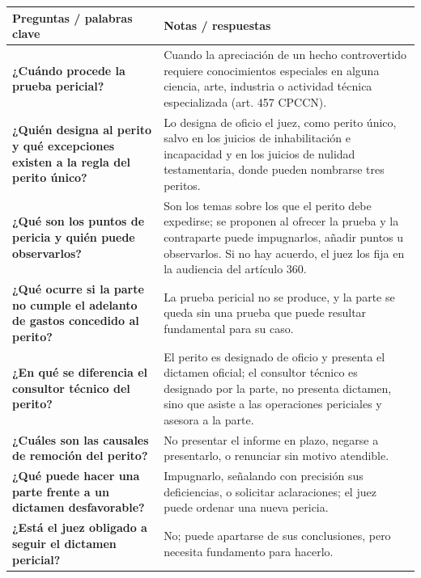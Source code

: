 \documentclass[12pt,oneside]{book}
\begin{document}
\begin{table}[H]
\centering
\begin{tabularx}{\textwidth}{
    >{\raggedright\arraybackslash}p{}
    >{\raggedright\arraybackslash}X
}
\toprule
\textbf{Preguntas / palabras clave} & \textbf{Notas / respuestas} \\
\midrule

\textbf{¿Cuándo procede la prueba pericial?} &
Cuando la apreciación de un hecho controvertido requiere conocimientos especiales en alguna ciencia, arte, industria o actividad técnica especializada (art. 457 CPCCN). \\

\textbf{¿Quién designa al perito y qué excepciones existen a la regla del perito único?} &
Lo designa de oficio el juez, como perito único, salvo en los juicios de inhabilitación e incapacidad y en los juicios de nulidad testamentaria, donde pueden nombrarse tres peritos. \\

\textbf{¿Qué son los puntos de pericia y quién puede observarlos?} &
Son los temas sobre los que el perito debe expedirse; se proponen al ofrecer la prueba y la contraparte puede impugnarlos, añadir puntos u observarlos. Si no hay acuerdo, el juez los fija en la audiencia del artículo 360. \\

\textbf{¿Qué ocurre si la parte no cumple el adelanto de gastos concedido al perito?} &
La prueba pericial no se produce, y la parte se queda sin una prueba que puede resultar fundamental para su caso. \\

\textbf{¿En qué se diferencia el consultor técnico del perito?} &
El perito es designado de oficio y presenta el dictamen oficial; el consultor técnico es designado por la parte, no presenta dictamen, sino que asiste a las operaciones periciales y asesora a la parte. \\

\textbf{¿Cuáles son las causales de remoción del perito?} &
No presentar el informe en plazo, negarse a presentarlo, o renunciar sin motivo atendible. \\

\textbf{¿Qué puede hacer una parte frente a un dictamen desfavorable?} &
Impugnarlo, señalando con precisión sus deficiencias, o solicitar aclaraciones; el juez puede ordenar una nueva pericia. \\

\textbf{¿Está el juez obligado a seguir el dictamen pericial?} &
No; puede apartarse de sus conclusiones, pero necesita fundamento para hacerlo. \\


\end{tabularx}
\end{table}
\end{document}
